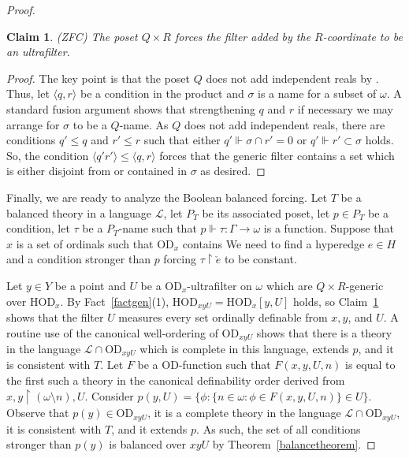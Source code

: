 \documentclass{article}
\newcommand{\gw}{\omega}
\newcommand{\gs}{\sigma}
\newcommand{\hvd}{\mathrm{HOD}}
\newcommand{\vd}{\mathrm{OD}}
\newtheorem{claim}[theorem]{Claim}
\theoremstyle{definition}
\begin{document}
\begin{proof}
		\begin{claim}
\label{qrclaim}
		(ZFC) The poset $Q\times R$ forces the filter added by the $R$-coordinate to be an ultrafilter.
		\end{claim}

\begin{proof}
The key point is that the poset $Q$ does not add independent reals by \cite{z:ramsey}. Thus, let $\langle q, r\rangle$ be a condition in the product and $\gs$ is a name for a subset of $\gw$. A standard fusion argument shows that strengthening $q$ and $r$ if necessary we may arrange for $\gs$ to be a $Q$-name. As $Q$ does not add independent reals, there are conditions $q'\leq q$ and $r'\leq r$ such that either $q'\Vdash\gs\cap r'=0$ or $q'\Vdash r'\subset\gs$ holds. So, the condition $\langle q' r'\rangle\leq \langle q, r\rangle$ forces that the generic filter contains a set which is either disjoint from or contained in $\gs$ as desired.
\end{proof}



Finally, we are ready to analyze the Boolean balanced forcing. Let $T$ be a balanced theory in a language $\mathcal{L}$, let $P_T$ be its associated poset, let $p\in P_T$ be a condition, let $\tau$ be a $P_T$-name such that $p\Vdash\tau\colon\Gamma\to\gw$ is a function. Suppose that $x$ is a set of ordinals such that $\vd_x$ contains We need to find a hyperedge $e\in H$ and a condition stronger than $p$ forcing $\tau\restriction\check e$ to be constant.

Let $y\in Y$ be a point and $U$ be a $\vd_x$-ultrafilter on $\gw$ which are $Q\times R$-generic over $\hvd_x$. By Fact~\ref{factgen}(1), $\hvd_{xyU}=\hvd_x[y, U]$ holds, so Claim~\ref{qrclaim} shows that the filter $U$ measures every set ordinally definable from $x, y$, and $U$.
A routine use of the canonical well-ordering of $\vd_{xyU}$ shows that there is a theory in the language $\mathcal{L}\cap\vd_{xyU}$ which is complete in this language, extends $p$, and it is consistent with $T$. Let $F$ be a $\vd$-function such that $F(x, y, U, n)$ is equal to the first such a theory in the canonical definability order derived from $x, y\restriction (\gw\setminus n), U$. Consider $p(y, U)=\{\phi\colon\{n\in\gw\colon \phi\in F(x, y, U, n)\}\in U\}$. Observe that $p(y)\in\vd_{xyU}$, it is a complete theory in the language $\mathcal{L}\cap\vd_{xyU}$, it is consistent with $T$, and it extends $p$. As such, the set of all conditions stronger than $p(y)$ is balanced over $xyU$ by Theorem~\ref{balancetheorem}.


\end{proof}
\end{document}
